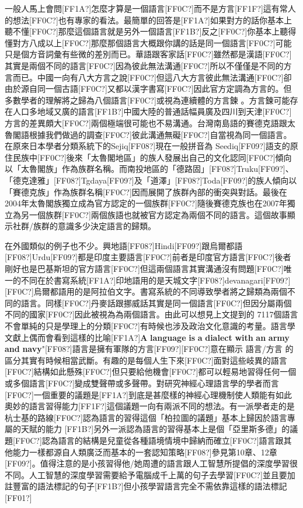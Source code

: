 一般人馬上會問[FF1A?]怎麼才算是一個語言[FF0C?]而不是方言[FF1F?]這有常人的想法[FF0C?]也有專家的看法。最簡單的回答是[FF1A?]如果對方的話你基本上聽不懂[FF0C?]那麼這個語言就是另外一個語言[FF1B?]反之[FF0C?]你基本上聽得懂對方八成以上[FF0C?]那麼那個語言大概跟你講的話是同一個語言[FF0C?]可能只是個方音詞彙有些微的差別而已。華語跟客家話[FF0C?]雖然都是漢語[FF0C?]其實是兩個不同的語言[FF0C?]因為彼此無法溝通[FF0C?]所以不僅僅是不同的方言而已。中國一向有八大方言之說[FF0C?]但這八大方言彼此無法溝通[FF0C?]卻由於源自同一個古語[FF0C?]又都以漢字書寫[FF0C?]因此官方定調為方言的。但多數學者的理解將之歸為八個語言[FF0C?]或視為連續體的方言鍊 。方言鍊可能存在人口多地域又廣的語言[FF1B?]中國大陸的普通話幅員廣及四川到天津[FF0C?]方言的差異頗大[FF0C?]兩個極端很可能也不易溝通。台灣南島語的賽德克語跟太魯閣語根據我們做過的調查[FF0C?]彼此溝通無礙[FF0C?]自當視為同一個語言。在原來日本學者分類系統下的Sejiq[FF08?]現在一般拼音為 Seediq[FF09?]語支的原住民族中[FF0C?]後來「太魯閣地區」的族人發展出自己的文化認同[FF0C?]傾向以「太魯閣族」作為族群名稱。而南投地區的「德路固」[FF08?]Truku[FF09?]、「德克達雅」[FF08?]Tgdaya[FF09?]及「道澤」[FF08?]Toda[FF09?]的族人傾向以「賽德克族」作為族群名稱[FF0C?]因而展開了族群內部的衝突與對話。最後在 2004年太魯閣族獨立成為官方認定的一個族群[FF0C?]隨後賽德克族也在2007年獨立為另一個族群[FF0C?]兩個族語也就被官方認定為兩個不同的語言。這個故事顯示社群/族群的意識多少決定語言的歸類。

在外國類似的例子也不少。興地語[FF08?]Hindi[FF09?]跟烏爾都語[FF08?]Urdu[FF09?]都是印度主要語言[FF0C?]前者是印度官方語言[FF0C?]後者剛好也是巴基斯坦的官方語言[FF0C?]但這兩個語言其實溝通沒有問題[FF0C?]唯一的不同在於書寫系統[FF1A?]印地語用的是天城文字[FF08?]devanagari[FF09?][FF0C?]烏爾都語用的是阿拉伯文字。書寫系統的不同導致學者將之歸類為兩個不同的語言。同樣[FF0C?]丹麥話跟挪威話其實是同一個語言[FF0C?]但因分屬兩個不同的國家[FF0C?]因此被視為為兩個語言。由此可以想見上文提到的 7117個語言不會單純的只是學理上的分類[FF0C?]有時候也涉及政治文化意識的考量。語言學文獻上偶而會看到這樣的比喻[FF1A?]\textbf{A} \textbf{language} \textbf{is} \textbf{a} \textbf{dialect} \textbf{with} \textbf{an} \textbf{army} \textbf{and} \textbf{navy}"[FF08?]語言是擁有軍隊的方言[FF09?][FF0C?]意在顯示 語言/方言 的區分其實有時候相當武斷。有趣的是每個人生下來[FF0C?]面對這些岐異的語言[FF0C?]結構如此懸殊[FF0C?]但只要給他機會[FF0C?]都可以輕易地習得任何一個或多個語言[FF0C?]變成雙聲帶或多聲帶。對研究神經心理語言學的學者而言[FF0C?]一個重要的議題是[FF1A?]到底是甚麼樣的神經心理機制使人類能有如此奧妙的語言習得能力[FF1F?]這個議題一向有兩派不同的想法。有一派學者走的是杭士基的路線[FF0C?]認為語言的習得這個「柏拉圖的議題」基本上歸因於語言專屬的天賦的能力 [FF1B?]另外一派認為語言的習得基本上是個「亞里斯多德」的議題[FF0C?]認為語言的結構是兒童從各種語境情境中歸納而確立[FF0C?]語言跟其他能力一樣都源自人類廣泛而基本的一套認知策略[FF08?]參見第10章、12章[FF09?]。值得注意的是小孩習得他/她周遭的語言跟人工智慧所提倡的深度學習很不同。人工智慧的深度學習需要給予電腦成千上萬的句子去學習[FF0C?]並且要加註豐富的語法標記的句子[FF1B?]但小孩學習語言完全不需依靠這樣的語法標記[FF01?]

